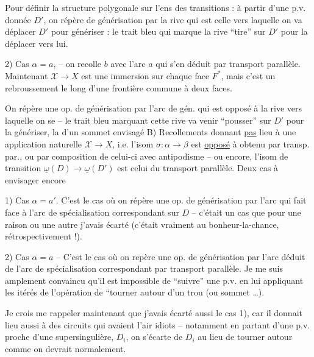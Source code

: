  Pour définir la structure polygonale sur l'ens des transitions : à partir d'une p.v. donnée $D'$, on répère   de générisation par la rive qui est  celle vers laquelle on va déplacer $D'$ pour génériser : le trait bleu qui marque la rive ``tire'' sur $D'$ pour la déplacer vers lui.

2) Cas $\alpha=a$, -- on recolle $b$ avec l'arc $a$ qui s'en déduit par transport parallèle. Maintenant $\mathscr X\to X$ est une immersion sur chaque face $F^*$, mais c'est un rebroussement le long d'une frontière commune à deux faces.

On répère une op. de générisation par  l'arc de gén. qui est opposé à la rive vers laquelle on se  -- le trait bleu marquant cette rive va venir ``pousser'' sur $D'$ pour la génériser,  la  d'un sommet envisagé
B) Recollements  donnant \uline{pas} lieu à une application naturelle $\mathscr X\to X$, i.e. l'isom $\sigma:\alpha\to\beta$ est \uline{opposé} à  obtenu par transp. par., ou par composition de celui-ci avec antipodisme -- ou encore, l'isom de transition $\underline{\omega}(D)\to\underline{\omega}(D')$ est  celui du transport parallèle. Deux cas à envisager encore

1) Cas $\alpha=a'$. C'est le cas où on répère une op. de générisation  par l'arc qui fait face à l'arc de spécialisation correspondant sur $D$ -- c'était un cas que pour une raison ou une autre j'avais écarté (c'était vraiment au bonheur-la-chance, rétrospectivement !).

2) Cas $\alpha=a$ -- C'est le cas où on repère une op. de générisation par l'arc  déduit de l'arc de spécialisation correspondant par transport parallèle. Je me suis amplement convaincu qu'il est impossible de ``suivre'' une p.v. en lui appliquant les itérés de l'opération \deleted{\unsure{\ensuremath{\rho}|\ensuremath{\beta}}} de ``tourner autour d'un trou (ou sommet \ldots).

Je crois me rappeler maintenant que j'avais écarté aussi le cas 1), car il donnait lieu aussi à des circuits qui avaient l'air idiots -- notamment en partant d'une p.v. proche d'une supersingulière, $D_i$, on s'écarte de $D_i$ au lieu de tourner autour comme on devrait normalement.

